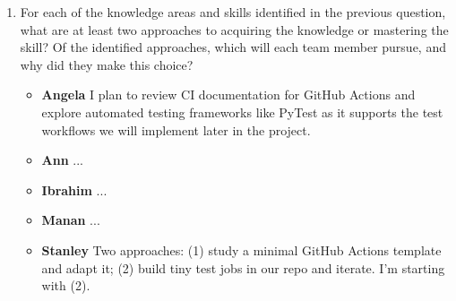 \documentclass[12pt, titlepage]{article}
\begin{document}
\begin{enumerate}
  \item For each of the knowledge areas and skills identified in the previous
  question, what are at least two approaches to acquiring the knowledge or
  mastering the skill?  Of the identified approaches, which will each team
  member pursue, and why did they make this choice?
  \begin{itemize}
      \item \textbf{Angela} I plan to review CI documentation for GitHub Actions and explore automated testing frameworks like PyTest as it supports the test workflows we will implement later in the project.
      \item \textbf{Ann} ...
      \item \textbf{Ibrahim} ...
      \item \textbf{Manan} ...
      \item \textbf{Stanley} Two approaches: (1) study a minimal GitHub Actions template and adapt it; (2) build tiny test jobs in our repo and iterate. I’m starting with (2).
    \end{itemize}

\end{enumerate}
\end{document}
